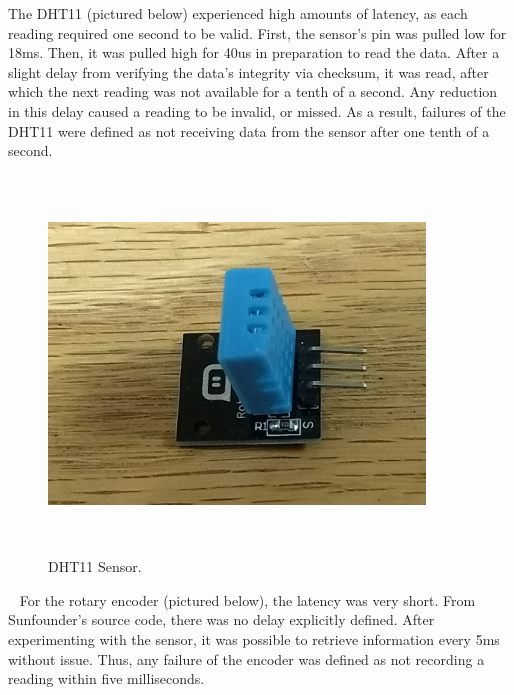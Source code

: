 \documentclass[letterpaper, 12pt]{article}
\begin{document}
\indent The DHT11 (pictured below) experienced high amounts of latency, as each reading required one second to be valid.  First, the sensor's pin was pulled low for 18ms. Then, it was pulled high for 40us in preparation to read the data.  After a slight delay from verifying the data's integrity via checksum, it was read, after which the next reading was not available for a tenth of a second.  Any reduction in this delay caused a reading to be invalid, or missed.  As a result, failures of the DHT11 were defined as not receiving data from the sensor after one tenth of a second.
~\newline 
\begin{figure}[H]
	\centering
	\includegraphics[width=10cm,height=10cm,keepaspectratio]{humitemp.jpg}
	\caption[Sensor1]{DHT11 Sensor.}
	\label{fig:htsensor}
\end{figure}
~\newline
\indent For the rotary encoder (pictured below), the latency was very short.  From Sunfounder's source code, there was no delay explicitly defined.  After experimenting with the sensor, it was possible to retrieve information every 5ms without issue.  Thus, any failure of the encoder was defined as not recording a reading within five milliseconds.
~\newline 
\end{document}
